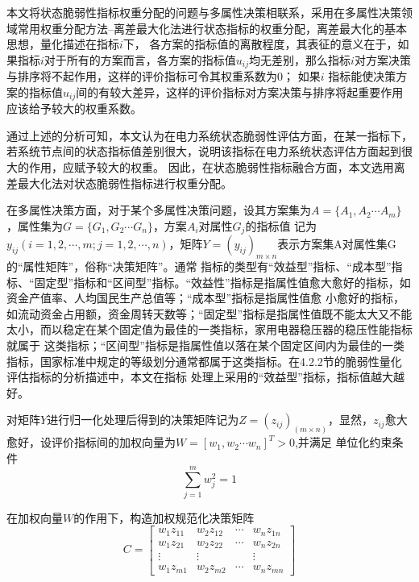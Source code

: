 本文将状态脆弱性指标权重分配的问题与多属性决策相联系，采用在多属性决策领域常用权重分配方法--离差最大化法进行状态指标的权重分配，离差最大化的基本思想，量化描述在指标$i$下，
各方案的指标值的离散程度，其表征的意义在于，如果指标$i$对于所有的方案而言，各方案的指标值$u_{ij}$均无差别，那么指标$i$对方案决策与排序将不起作用，这样的评价指标可令其权重系数为0；
如果$i$ 指标能使决策方案的指标值$u_{ij}$间的有较大差异，这样的评价指标对方案决策与排序将起重要作用应该给予较大的权重系数\cite{refs77,refs78}。

通过上述的分析可知，本文认为在电力系统状态脆弱性评估方面，在某一指标下，若系统节点间的状态指标值差别很大，说明该指标在电力系统状态评估方面起到很大的作用，应赋予较大的权重。
因此，在状态脆弱性指标融合方面，本文选用离差最大化法对状态脆弱性指标进行权重分配。

在多属性决策方面，对于某个多属性决策问题，设其方案集为$A = \{A_1,A_2 \cdots A_m\}$，属性集为$G = \{G_1,G_2 \cdots G_n\}$，方案$A_i$对属性$G_j$的指标值
记为$y_{ij}\left(i = 1,2,\cdots,m;j = 1,2,\cdots,n\right)$，矩阵$Y = \left(y_{ij}\right)_{m \times n}$表示方案集A对属性集G的“属性矩阵”，俗称“决策矩阵”。通常
指标的类型有“效益型”指标、“成本型”指标、“固定型”指标和“区间型”指标。“效益性”指标是指属性值愈大愈好的指标，如资金产值率、人均国民生产总值等；“成本型”指标是指属性值愈
小愈好的指标，如流动资金占用额，资金周转天数等；“固定型”指标是指属性值既不能太大又不能太小，而以稳定在某个固定值为最佳的一类指标，家用电器稳压器的稳压性能指标就属于
这类指标；“区间型”指标是指属性值以落在某个固定区间内为最佳的一类指标，国家标准中规定的等级划分通常都属于这类指标。在4.2.2节的脆弱性量化评估指标的分析描述中，本文在指标
处理上采用的“效益型”指标，指标值越大越好\cite{refs78}。

对矩阵$Y$进行归一化处理后得到的决策矩阵记为$Z = (z_{ij})_(m \times n)$，显然，$z_{ij}$愈大愈好，设评价指标间的加权向量为$W = [w_1,w_2 \cdots w_n]^T > 0$,并满足
单位化约束条件
\begin{equation}
  \sum_{j=1}^{m} w_{j}^{2}=1
\end{equation}
  
在加权向量$W$的作用下，构造加权规范化决策矩阵
\begin{equation}
C = \left[\begin{array}{cccc}{w_{1} z_{11}} & {w_{2} z_{12}} & {\cdots} & {w_{n} z_{1 n}} \\ {w_{1} z_{21}} & {w_{2} z_{22}} & {\cdots} & {w_{n} z_{2 n}} \\ 
{\vdots} & {\vdots} & {} & {\vdots} \\ {w_{1} z_{m 1}} & {w_{2} z_{m 2}} & {\cdots} & {w_{n} z_{m n}}\end{array}\right]
\end{equation}

